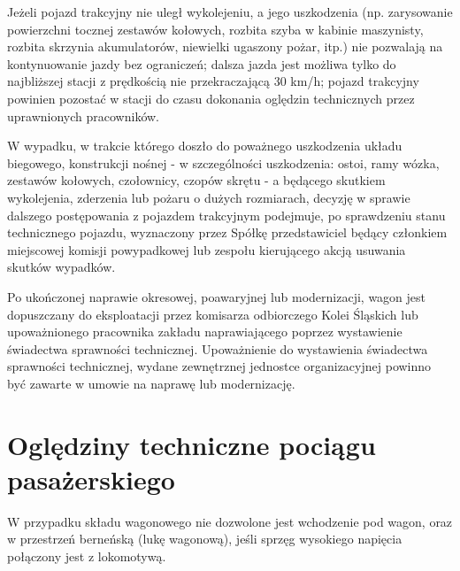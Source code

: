 Jeżeli pojazd trakcyjny nie uległ wykolejeniu, a jego uszkodzenia (np. zarysowanie powierzchni tocznej zestawów kołowych, rozbita szyba w kabinie maszynisty, rozbita skrzynia akumulatorów, niewielki ugaszony pożar, itp.) nie pozwalają na kontynuowanie jazdy bez ograniczeń; dalsza jazda jest możliwa tylko do najbliższej stacji z prędkością nie przekraczającą 30 km/h; pojazd trakcyjny powinien pozostać w stacji do czasu dokonania oględzin technicznych przez uprawnionych pracowników.

W wypadku, w trakcie którego doszło do poważnego uszkodzenia układu biegowego, konstrukcji nośnej - w szczególności uszkodzenia: ostoi, ramy wózka,
zestawów kołowych, czołownicy, czopów skrętu - a będącego skutkiem wykolejenia, zderzenia lub pożaru o dużych rozmiarach, decyzję w sprawie dalszego postępowania z pojazdem trakcyjnym podejmuje, po sprawdzeniu stanu technicznego pojazdu, wyznaczony przez Spółkę przedstawiciel będący członkiem miejscowej komisji powypadkowej lub zespołu kierującego akcją usuwania skutków wypadków.

Po ukończonej naprawie okresowej, poawaryjnej lub modernizacji, wagon jest dopuszczany do eksploatacji przez komisarza odbiorczego Kolei Śląskich lub upoważnionego pracownika zakładu naprawiającego poprzez wystawienie świadectwa sprawności technicznej. Upoważnienie do wystawienia świadectwa sprawności technicznej, wydane zewnętrznej jednostce organizacyjnej powinno być zawarte w umowie na naprawę lub modernizację.

\chapter{Oględziny techniczne pociągu pasażerskiego}

W przypadku składu wagonowego nie dozwolone jest wchodzenie pod wagon, oraz w przestrzeń berneńską (lukę wagonową), jeśli sprzęg wysokiego napięcia połączony jest z lokomotywą. 

